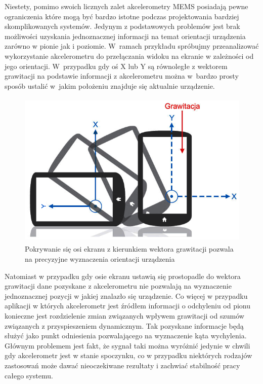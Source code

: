 Niestety, pomimo swoich licznych zalet akcelerometry MEMS posiadają pewne
ograniczenia które mogą być bardzo istotne podczas projektowania bardziej
skomplikowanych systemów. Jedynym z podstawowych problemów jest brak możliwości
uzyskania jednoznacznej informacji na temat orientacji urządzenia zarówno w
pionie jak i poziomie. W~ramach przykładu spróbujmy przeanalizować wykorzystanie
akcelerometru do przełączania widoku na ekranie w zależności od jego orientacji. 
W~przypadku gdy oś X lub Y są równoległe z wektorem grawitacji na podstawie
informacji z akcelerometru można w~bardzo prosty sposób ustalić w~jakim
położeniu znajduje się aktualnie urządzenie.

\begin{figure}[ht!]
 \centering
 \includegraphics[height=75mm]{../images/ch04/acc_orientation.png}
 \caption{Pokrywanie się osi ekranu z kierunkiem wektora grawitacji pozwala na
 precyzyjne wyznaczenia orientacji urządzenia\cite{website:elektronikab2b-zyroskop}}
 \label{fig:AkcelerometrOrientation}
\end{figure}

Natomiast w przypadku gdy osie ekranu ustawią się prostopadle do wektora
grawitacji dane pozyskane z akcelerometru nie pozwalają na wyznaczenie
jednoznacznej pozycji w jakiej znalazło się urządzenie\cite{website:elektronikab2b-zyroskop}. Co więcej w
przypadku aplikacji w których akcelerometr jest źródłem informacji o odchyleniu od pionu
konieczne jest rozdzielenie zmian związanych wpływem grawitacji od szumów
związanych z przyspieszeniem dynamicznym. Tak pozyskane informacje będą
służyć jako punkt odniesienia pozwalającego na wyznaczenie kąta wychylenia.
Głównym problemem jest fakt, że sygnał taki można wyróżnić jedynie w chwili gdy
akcelerometr jest w stanie spoczynku, co w przypadku niektórych rodzajów
zastosowań może dawać nieoczekiwane rezultaty i zachwiać stabilność pracy całego
systemu. 

